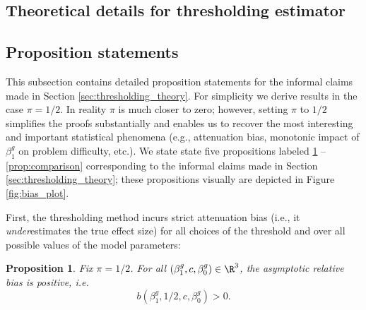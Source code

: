 \documentclass[11pt]{article}
\newtheorem{proposition}{Proposition}
\begin{document}
\begin{appendices}
\begin{refsection}
\section{Theoretical details for thresholding estimator}\label{sec:appendix_theory}

\subsection{Proposition statements}
This subsection contains detailed proposition statements for the informal claims made in Section \ref{sec:thresholding_theory}. For simplicity we derive results in the case $\pi = 1/2$. In reality $\pi$ is much closer to zero; however, setting $\pi$ to $1/2$ simplifies the proofs substantially and enables us to recover the most interesting and important statistical phenomena (e.g., attenuation bias, monotonic impact of $\beta^g_1$ on problem difficulty, etc.). We state state five propositions labeled \ref{prop:att_bias} -- \ref{prop:comparison} corresponding to the informal claims made in Section \ref{sec:thresholding_theory}; these propositions visually are depicted in Figure \ref{fig:bias_plot}.
 
First, the thresholding method incurs strict attenuation bias (i.e., it \textit{under}estimates the true effect size) for all choices of the threshold and over all possible values of the model parameters:
\begin{proposition}\label{prop:att_bias} Fix $\pi = 1/2$. For all $(\beta^g_1, c, \beta^g_0) \in \R^3$, the asymptotic relative bias is positive, i.e. 
	$$b(\beta^g_1, 1/2, c, \beta^g_0) > 0.$$
\end{proposition}


\end{refsection}
\end{appendices}
\end{document}
